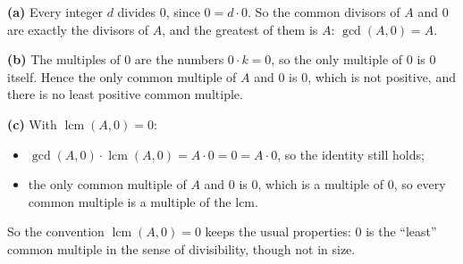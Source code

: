 \textbf{(a)} Every integer $d$ divides $0$, since $0=d\cdot0$. So the common divisors of $A$ and $0$ are exactly the divisors of $A$, and the greatest of them is $A$: $\gcd(A,0)=\boxed{A}$.

\textbf{(b)} The multiples of $0$ are the numbers $0\cdot k=0$, so the only multiple of $0$ is $0$ itself. Hence the only common multiple of $A$ and $0$ is $0$, which is not positive, and there is no least positive common multiple.

\textbf{(c)} With $\operatorname{lcm}(A,0)=0$:
\begin{itemize}
\item $\gcd(A,0)\cdot\operatorname{lcm}(A,0)=A\cdot0=0=A\cdot0$, so the identity still holds;
\item the only common multiple of $A$ and $0$ is $0$, which is a multiple of $0$, so every common multiple is a multiple of the lcm.
\end{itemize}
So the convention $\operatorname{lcm}(A,0)=0$ keeps the usual properties: $0$ is the ``least'' common multiple in the sense of divisibility, though not in size.
